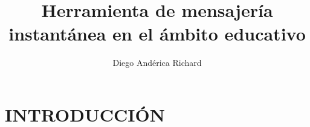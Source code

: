\documentclass{pre-tfg}
\title{Herramienta de mensajería instantánea en el ámbito educativo}
\author{Diego Andérica Richard}
\begin{document}
	
\renewcommand{\tablename}{Tabla}

\maketitle
\tableofcontents

\newpage

%

\section{INTRODUCCIÓN}

%
\end{document}
